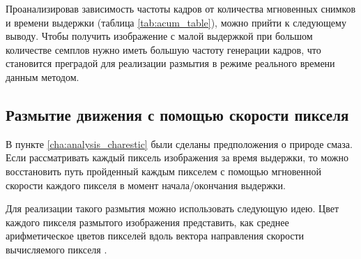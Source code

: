 Проанализировав зависимость частоты кадров от количества мгновенных снимков и времени выдержки (таблица \ref{tab:acum_table}), можно прийти к следующему выводу. Чтобы получить изображение с малой выдержкой при большом количестве семплов нужно иметь большую частоту генерации кадров, что становится преградой для реализации размытия в режиме реального времени данным методом.

\subsection{Размытие движения с помощью скорости пикселя}
\label{cha:analysis_pixelblur}


В пункте \ref{cha:analysis_charestic} были сделаны предположения о природе смаза. Если рассматривать каждый пиксель изображения за время выдержки, то можно восстановить путь пройденный каждым пикселем с помощью мгновенной скорости каждого пикселя в момент начала/окончания выдержки.


\par
Для реализации такого размытия можно использовать следующую идею. Цвет каждого пикселя размытого изображения представить, как среднее арифметическое цветов пикселей вдоль вектора направления скорости вычисляемого пикселя   \cite{GpuGems2008}.
\par


